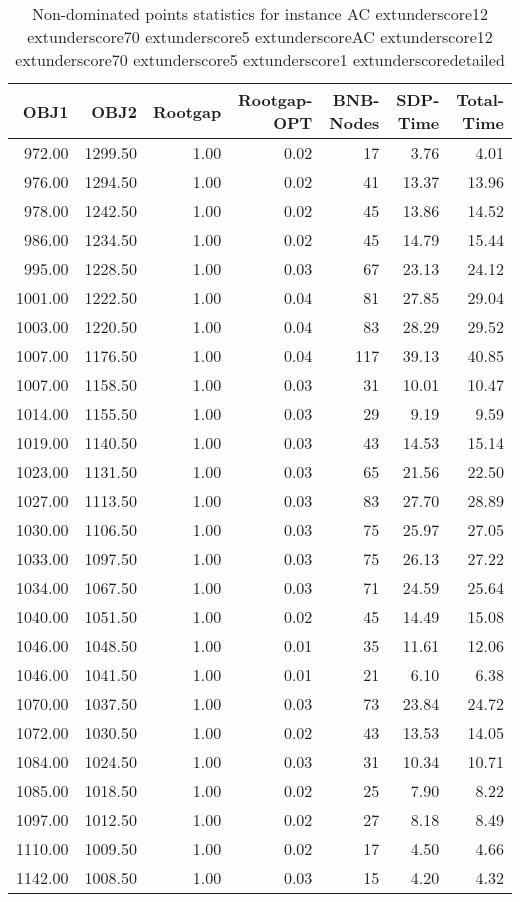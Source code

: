 \begin{table}
\caption{Non-dominated points statistics for instance AC	extunderscore12	extunderscore70	extunderscore5	extunderscoreAC	extunderscore12	extunderscore70	extunderscore5	extunderscore1	extunderscoredetailed}
\label{tab:stats/AC_12_70_5_AC_12_70_5_1_detailed}
\begin{tabular}{rrrrrrr}
\toprule
OBJ1 & OBJ2 & Rootgap & Rootgap-OPT & BNB-Nodes & SDP-Time & Total-Time \\
\midrule
972.00 & 1299.50 & 1.00 & 0.02 & 17 & 3.76 & 4.01 \\
976.00 & 1294.50 & 1.00 & 0.02 & 41 & 13.37 & 13.96 \\
978.00 & 1242.50 & 1.00 & 0.02 & 45 & 13.86 & 14.52 \\
986.00 & 1234.50 & 1.00 & 0.02 & 45 & 14.79 & 15.44 \\
995.00 & 1228.50 & 1.00 & 0.03 & 67 & 23.13 & 24.12 \\
1001.00 & 1222.50 & 1.00 & 0.04 & 81 & 27.85 & 29.04 \\
1003.00 & 1220.50 & 1.00 & 0.04 & 83 & 28.29 & 29.52 \\
1007.00 & 1176.50 & 1.00 & 0.04 & 117 & 39.13 & 40.85 \\
1007.00 & 1158.50 & 1.00 & 0.03 & 31 & 10.01 & 10.47 \\
1014.00 & 1155.50 & 1.00 & 0.03 & 29 & 9.19 & 9.59 \\
1019.00 & 1140.50 & 1.00 & 0.03 & 43 & 14.53 & 15.14 \\
1023.00 & 1131.50 & 1.00 & 0.03 & 65 & 21.56 & 22.50 \\
1027.00 & 1113.50 & 1.00 & 0.03 & 83 & 27.70 & 28.89 \\
1030.00 & 1106.50 & 1.00 & 0.03 & 75 & 25.97 & 27.05 \\
1033.00 & 1097.50 & 1.00 & 0.03 & 75 & 26.13 & 27.22 \\
1034.00 & 1067.50 & 1.00 & 0.03 & 71 & 24.59 & 25.64 \\
1040.00 & 1051.50 & 1.00 & 0.02 & 45 & 14.49 & 15.08 \\
1046.00 & 1048.50 & 1.00 & 0.01 & 35 & 11.61 & 12.06 \\
1046.00 & 1041.50 & 1.00 & 0.01 & 21 & 6.10 & 6.38 \\
1070.00 & 1037.50 & 1.00 & 0.03 & 73 & 23.84 & 24.72 \\
1072.00 & 1030.50 & 1.00 & 0.02 & 43 & 13.53 & 14.05 \\
1084.00 & 1024.50 & 1.00 & 0.03 & 31 & 10.34 & 10.71 \\
1085.00 & 1018.50 & 1.00 & 0.02 & 25 & 7.90 & 8.22 \\
1097.00 & 1012.50 & 1.00 & 0.02 & 27 & 8.18 & 8.49 \\
1110.00 & 1009.50 & 1.00 & 0.02 & 17 & 4.50 & 4.66 \\
1142.00 & 1008.50 & 1.00 & 0.03 & 15 & 4.20 & 4.32 \\
\bottomrule
\end{tabular}
\end{table}

